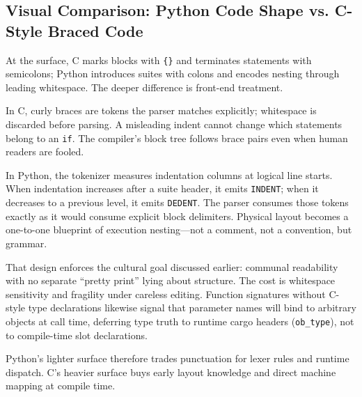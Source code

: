 \subsection{Visual Comparison: Python Code Shape vs. C-Style Braced Code}

At the surface, C marks blocks with \texttt{\{\}} and terminates statements with semicolons; Python introduces suites with colons and encodes nesting through leading whitespace. The deeper difference is front-end treatment.

In C, curly braces are tokens the parser matches explicitly; whitespace is discarded before parsing. A misleading indent cannot change which statements belong to an \texttt{if}. The compiler's block tree follows brace pairs even when human readers are fooled.

In Python, the tokenizer measures indentation columns at logical line starts. When indentation increases after a suite header, it emits \texttt{INDENT}; when it decreases to a previous level, it emits \texttt{DEDENT}. The parser consumes those tokens exactly as it would consume explicit block delimiters. Physical layout becomes a one-to-one blueprint of execution nesting---not a comment, not a convention, but grammar.

That design enforces the cultural goal discussed earlier: communal readability with no separate ``pretty print'' lying about structure. The cost is whitespace sensitivity and fragility under careless editing. Function signatures without C-style type declarations likewise signal that parameter names will bind to arbitrary objects at call time, deferring type truth to runtime cargo headers (\texttt{ob\_type}), not to compile-time slot declarations.

Python's lighter surface therefore trades punctuation for lexer rules and runtime dispatch. C's heavier surface buys early layout knowledge and direct machine mapping at compile time.
